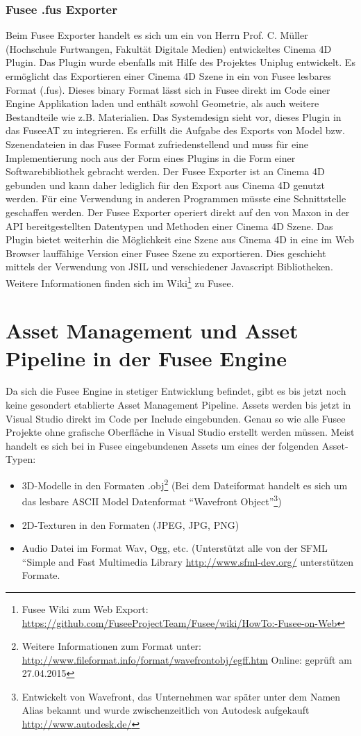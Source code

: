 \documentclass[pagesize, paper=a4, fontsize=12pt, titlepage=true, headings=small, headnosepline, abstractoff, liststotoc, nochapterprefix, plainheadsepline, twoside]{scrreprt}
\begin{document}
\subsubsection{Fusee .fus Exporter}
Beim Fusee Exporter handelt es sich um ein von Herrn Prof. C. Müller (Hochschule Furtwangen, Fakultät Digitale Medien) entwickeltes Cinema 4D Plugin. Das Plugin wurde ebenfalls mit Hilfe des Projektes Uniplug entwickelt. Es ermöglicht das Exportieren einer Cinema 4D Szene in ein von Fusee lesbares Format (.fus). Dieses binary Format lässt sich in Fusee direkt im Code einer Engine Applikation laden und enthält sowohl Geometrie, als auch weitere Bestandteile wie z.B. Materialien. Das Systemdesign sieht vor, dieses Plugin in das FuseeAT zu integrieren. Es erfüllt die Aufgabe des Exports von Model bzw. Szenendateien in das Fusee Format zufriedenstellend und muss für eine Implementierung noch aus der Form eines Plugins in die Form einer Softwarebibliothek gebracht werden. Der Fusee Exporter ist an Cinema 4D gebunden und kann daher lediglich für den Export aus Cinema 4D genutzt werden. Für eine Verwendung in anderen Programmen müsste eine Schnittstelle geschaffen werden. Der Fusee Exporter operiert direkt auf den von Maxon in der API bereitgestellten Datentypen und Methoden einer Cinema 4D Szene.
Das Plugin bietet weiterhin die Möglichkeit eine Szene aus Cinema 4D in eine im Web Browser lauffähige Version einer Fusee Szene zu exportieren. Dies geschieht mittels der Verwendung von JSIL und verschiedener Javascript Bibliotheken. Weitere Informationen finden sich im Wiki\footnote{Fusee Wiki zum Web Export: \url{https://github.com/FuseeProjectTeam/Fusee/wiki/HowTo:-Fusee-on-Web}} zu Fusee.

\section{Asset Management und Asset Pipeline in der Fusee Engine}
Da sich die Fusee Engine in stetiger Entwicklung befindet, gibt es bis jetzt noch keine gesondert etablierte Asset Management Pipeline. Assets werden bis jetzt in Visual Studio direkt im Code per Include eingebunden. Genau so wie alle Fusee Projekte ohne grafische Oberfläche in Visual Studio erstellt werden müssen. Meist handelt es sich bei in Fusee eingebundenen Assets um eines der folgenden Asset-Typen:
\begin{itemize}
\item 3D-Modelle in den Formaten .obj\footnote{Weitere Informationen zum Format unter: \url{http://www.fileformat.info/format/wavefrontobj/egff.htm} Online: geprüft am 27.04.2015} (Bei dem Dateiformat handelt es sich um das lesbare ASCII Model Datenformat “Wavefront Object”\footnote{Entwickelt von Wavefront, das Unternehmen war später unter dem Namen Alias bekannt und wurde zwischenzeitlich von Autodesk aufgekauft \url{http://www.autodesk.de/}})
\item 2D-Texturen in den Formaten (JPEG, JPG, PNG)
\item Audio Datei im Format Wav, Ogg, etc. (Unterstützt alle von der SFML “Simple and Fast Multimedia Library \url{http://www.sfml-dev.org/} unterstützen Formate.
\end{itemize}
\end{document}
